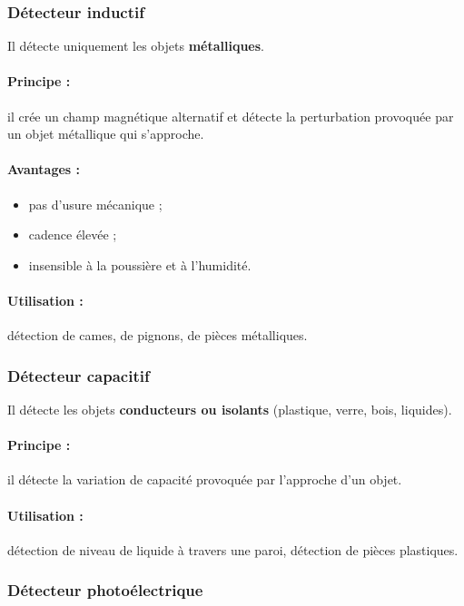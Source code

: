 \subsubsection{Détecteur inductif}

Il détecte uniquement les objets \textbf{métalliques}.

\paragraph{Principe :} il crée un champ magnétique alternatif et détecte la perturbation provoquée par un objet métallique qui s'approche.

\paragraph{Avantages :}
\begin{itemize}
    \item pas d'usure mécanique ;
    \item cadence élevée ;
    \item insensible à la poussière et à l'humidité.
\end{itemize}

\paragraph{Utilisation :} détection de cames, de pignons, de pièces métalliques.

\subsubsection{Détecteur capacitif}

Il détecte les objets \textbf{conducteurs ou isolants} (plastique, verre, bois, liquides).

\paragraph{Principe :} il détecte la variation de capacité provoquée par l'approche d'un objet.

\paragraph{Utilisation :} détection de niveau de liquide à travers une paroi, détection de pièces plastiques.

\subsubsection{Détecteur photoélectrique}

